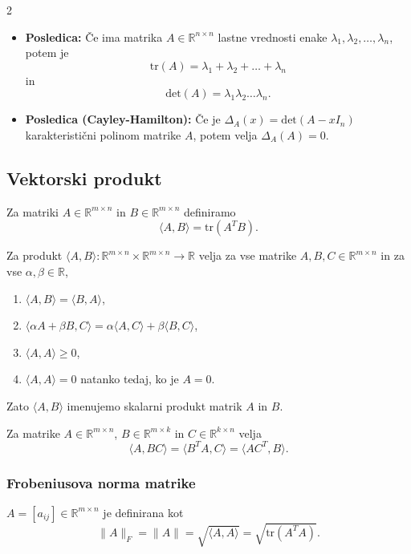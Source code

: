 \documentclass{article}
\begin{document}
\begin{multicols}{2}
\begin{itemize}
		\item \textbf{Posledica:} Če ima matrika \( A \in \mathbb{R}^{n \times n} \) lastne vrednosti enake \( \lambda_1, \lambda_2, \ldots, \lambda_n \), potem je
		      \[
			      \text{tr}(A) = \lambda_1 + \lambda_2 + \ldots + \lambda_n
		      \]
		      in
		      \[
			      \text{det}(A) = \lambda_1 \lambda_2 \ldots \lambda_n.
		      \]

		\item \textbf{Posledica (Cayley-Hamilton):} Če je \( \Delta_A(x) = \text{det}(A - xI_n) \) karakteristični polinom matrike \( A \), potem velja \( \Delta_A(A) = 0 \).
	\end{itemize}

	\subsection{Vektorski produkt}

	Za matriki \( A \in \mathbb{R}^{m \times n} \) in \( B \in \mathbb{R}^{m \times n} \) definiramo
	\[
		\langle A, B \rangle = \text{tr}(A^T B).
	\]

	Za produkt \( \langle A, B \rangle: \mathbb{R}^{m \times n} \times \mathbb{R}^{m \times n} \rightarrow \mathbb{R} \) velja za vse matrike \( A, B, C \in \mathbb{R}^{m \times n} \) in za vse \( \alpha, \beta \in \mathbb{R} \),
	\begin{enumerate}
		\item \( \langle A, B \rangle = \langle B, A \rangle \),
		\item \( \langle \alpha A + \beta B, C \rangle = \alpha \langle A, C \rangle + \beta \langle B, C \rangle \),
		\item \( \langle A, A \rangle \geq 0 \),
		\item \( \langle A, A \rangle = 0 \) natanko tedaj, ko je \( A = 0 \).
	\end{enumerate}
	Zato \( \langle A, B \rangle \) imenujemo skalarni produkt matrik \( A \) in \( B \).

	Za matrike \( A \in \mathbb{R}^{m \times n} \), \( B \in \mathbb{R}^{m \times k} \) in \( C \in \mathbb{R}^{k \times n} \) velja
	\[
		\langle A, BC \rangle = \langle B^T A, C \rangle = \langle A C^T, B \rangle.
	\]


	\subsubsection{Frobeniusova norma matrike} \( A = [a_{ij}] \in \mathbb{R}^{m \times n} \) je definirana kot
	\[
		\|A\|_F = \|A\| = \sqrt{\langle A, A \rangle} = \sqrt{\text{tr}(A^T A)}.
	\]


\end{multicols}
\end{document}
